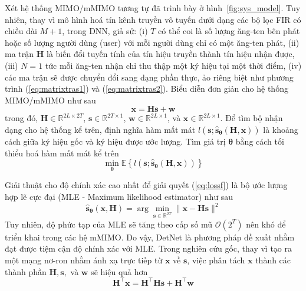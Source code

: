 Xét hệ thống MIMO/mMIMO tương tự đã trình bày ở hình~\ref{fig:sys_model}. Tuy nhiên, thay vì mô hình hoá tín kênh truyền vô tuyến dưới dạng các bộ lọc FIR có chiều dài $M+1$, trong DNN, giả sử: (i) $T$ có thể coi là số lượng ăng-ten bên phát hoặc số lượng người dùng (user) với mỗi người dùng chỉ có một ăng-ten phát, (ii) ma trận $\mathbf{H}$ là biến đổi tuyến tính của tín hiệu truyền thành tín hiệu nhận được, (iii) $N=1$ tức mỗi ăng-ten nhận chỉ thu thập một ký hiệu tại một thời điểm, (iv) các ma trận sẽ được chuyển đổi sang dạng phần thực, ảo riêng biệt như phương trình (\ref{eq:matrixtras1}) và (\ref{eq:matrixtras2}). Biểu diễn đơn giản cho hệ thống MIMO/mMIMO như sau
\begin{equation}
    \mathbf{x} = \mathbf{H} \mathbf{s} + \mathbf{w}
\end{equation}
trong đó, $\mathbf{H} \in \mathbb{R}^{2L \times 2T}$, $\mathbf{s} \in \mathbb{R}^{2T \times 1}$, $\mathbf{w} \in \mathbb{R}^{2L \times 1}$, và $\mathbf{x} \in \mathbb{R}^{2L \times 1}$. Để tìm bộ nhận dạng cho hệ thống kể trên, định nghĩa hàm mất mát $l\left(\mathbf{s} ; \hat{\mathbf{s}}_{\boldsymbol{\theta}}(\mathbf{H}, \mathbf{x})\right)$ là khoảng cách giữa ký hiệu gốc và ký hiệu được ước lượng. Tìm giá trị $\mathbf{\theta}$ bằng cách tối thiểu hoá hàm mất mát kể trên  
\begin{equation}
\label{eq:lossf}
\min _{\boldsymbol{\theta}} \mathbb{E}\left\{l\left(\mathbf{s} ; \hat{\mathbf{s}}_{\boldsymbol{\theta}}(\mathbf{H}, \mathbf{x})\right)\right\}
\end{equation}

Giải thuật cho độ chính xác cao nhất để giải quyết (\ref{eq:lossf}) là bộ ước lượng hợp lẽ cực đại (MLE - Maximum likelihood estimator) như sau
\begin{equation}
\label{eq:mle}
\hat{\mathbf{s}}_{\boldsymbol{\theta}}(\mathbf{x}, \mathbf{H})=\arg \min _{\mathbf{s} \in \mathbb{R}^{2T}}\|\mathbf{x}-\mathbf{H} \mathbf{s}\|^2
\end{equation}
Tuy nhiên, độ phức tạp của MLE sẽ tăng theo cấp số mũ $\mathcal{O}(2^T)$ nên khó để triển khai trong các hệ mMIMO. Do vậy, DetNet là phương pháp đề xuất nhằm đạt được tiệm cận độ chính xác với MLE. Trong nghiên cứu gốc, thay vì tạo ra một mạng nơ-ron nhằm ánh xạ trực tiếp từ $\mathbf{x}$ về $\mathbf{s}$, việc phân tách $\mathbf{x}$ thành các thành phần $\mathbf{H}, \mathbf{s},$ và $\mathbf{w}$ sẽ hiệu quả hơn
\begin{equation}
    \mathbf{H}^\top \mathbf{x}=\mathbf{H}^\top \mathbf{H s}+\mathbf{H}^\top \mathbf{w}
\end{equation}

